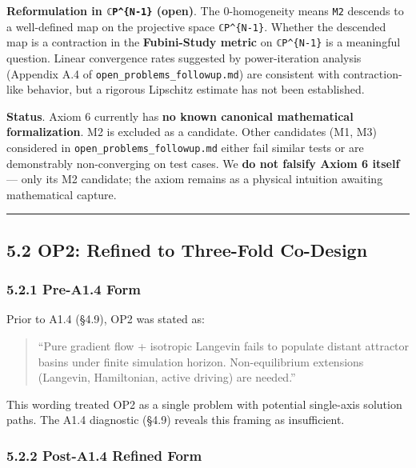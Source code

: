 \documentclass[
]{article}
\begin{document}
\textbf{Reformulation in \texttt{ℂP\^{}\{N-1\}} (open)}. The
0-homogeneity means \texttt{M2} descends to a well-defined map on the
projective space \texttt{ℂP\^{}\{N-1\}}. Whether the descended map is a
contraction in the \textbf{Fubini-Study metric} on
\texttt{ℂP\^{}\{N-1\}} is a meaningful question. Linear convergence
rates suggested by power-iteration analysis (Appendix A.4 of
\texttt{open\_problems\_followup.md}) are consistent with
contraction-like behavior, but a rigorous Lipschitz estimate has not
been established.

\textbf{Status}. Axiom 6 currently has \textbf{no known canonical
mathematical formalization}. M2 is excluded as a candidate. Other
candidates (M1, M3) considered in \texttt{open\_problems\_followup.md}
either fail similar tests or are demonstrably non-converging on test
cases. We \textbf{do not falsify Axiom 6 itself} --- only its M2
candidate; the axiom remains as a physical intuition awaiting
mathematical capture.

\begin{center}\rule{0.5\linewidth}{0.5pt}\end{center}

\hypertarget{op2-refined-to-three-fold-co-design}{%
\subsection{5.2 OP2: Refined to Three-Fold
Co-Design}\label{op2-refined-to-three-fold-co-design}}

\hypertarget{pre-a1.4-form}{%
\subsubsection{5.2.1 Pre-A1.4 Form}\label{pre-a1.4-form}}

Prior to A1.4 (§4.9), OP2 was stated as:

\begin{quote}
``Pure gradient flow + isotropic Langevin fails to populate distant
attractor basins under finite simulation horizon. Non-equilibrium
extensions (Langevin, Hamiltonian, active driving) are needed.''
\end{quote}

This wording treated OP2 as a single problem with potential single-axis
solution paths. The A1.4 diagnostic (§4.9) reveals this framing as
insufficient.

\hypertarget{post-a1.4-refined-form}{%
\subsubsection{5.2.2 Post-A1.4 Refined
Form}\label{post-a1.4-refined-form}}
\end{document}
